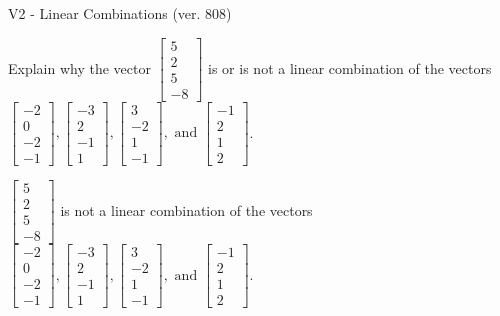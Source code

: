 \begin{exercise}
  \begin{exerciseTitle}V2 - Linear Combinations (ver. 808)\end{exerciseTitle}
  \begin{exerciseStatement}
    Explain why the vector \(\left[\begin{array}{c}
5 \\
2 \\
5 \\
-8
\end{array}\right]\)  is or is not a linear 
	combination of the vectors \(\left[\begin{array}{c}
-2 \\
0 \\
-2 \\
-1
\end{array}\right] , \left[\begin{array}{c}
-3 \\
2 \\
-1 \\
1
\end{array}\right] , \left[\begin{array}{c}
3 \\
-2 \\
1 \\
-1
\end{array}\right] , \text{ and } \left[\begin{array}{c}
-1 \\
2 \\
1 \\
2
\end{array}\right]\).
	


  \end{exerciseStatement}
  \begin{exerciseAnswer}
   \(\left[\begin{array}{c}
5 \\
2 \\
5 \\
-8
\end{array}\right]\) 
  	 is not  
	a linear combination of the vectors \(\left[\begin{array}{c}
-2 \\
0 \\
-2 \\
-1
\end{array}\right] , \left[\begin{array}{c}
-3 \\
2 \\
-1 \\
1
\end{array}\right] , \left[\begin{array}{c}
3 \\
-2 \\
1 \\
-1
\end{array}\right] , \text{ and } \left[\begin{array}{c}
-1 \\
2 \\
1 \\
2
\end{array}\right]\).


\end{exerciseAnswer}
\end{exercise}
